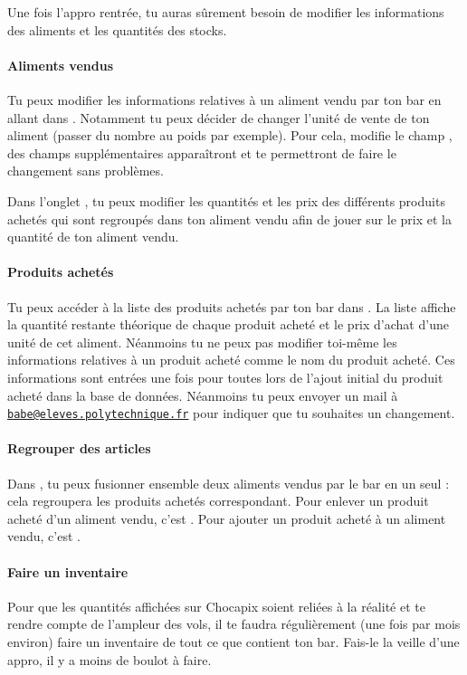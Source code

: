 \documentclass[12pt,french]{article}
\begin{document}
Une fois l'appro rentrée, tu auras sûrement besoin de modifier les informations des aliments et les quantités des stocks.

\paragraph{Aliments vendus} Tu peux modifier les informations relatives à un aliment vendu par ton bar en allant dans . Notamment tu peux décider de changer l'unité de vente de ton aliment (passer du nombre au poids par exemple). Pour cela, modifie le champ , des champs supplémentaires apparaîtront et te permettront de faire le changement sans problèmes.

Dans l'onglet , tu peux modifier les quantités et les prix des différents produits achetés qui sont regroupés dans ton aliment vendu afin de jouer sur le prix et la quantité de ton aliment vendu.

\paragraph{Produits achetés} Tu peux accéder à la liste des produits achetés par ton bar dans . La liste affiche la quantité restante théorique de chaque produit acheté et le prix d'achat d'une unité de cet aliment. Néanmoins tu ne peux pas modifier toi-même les informations relatives à un produit acheté comme le nom du produit acheté. Ces informations sont entrées une fois pour toutes lors de l'ajout initial du produit acheté dans la base de données. Néanmoins tu peux envoyer un mail à \href{mailto:babe@eleves.polytechnique.fr}{\texttt{babe@eleves.polytechnique.fr}} pour indiquer que tu souhaites un changement.

\paragraph{Regrouper des articles} Dans , tu peux fusionner ensemble deux aliments vendus par le bar en un seul : cela regroupera les produits achetés correspondant. Pour enlever un produit acheté d'un aliment vendu, c'est . Pour ajouter un produit acheté à un aliment vendu, c'est .

\paragraph{Faire un inventaire} Pour que les quantités affichées sur Chocapix soient reliées à la réalité et te rendre compte de l'ampleur des vols, il te faudra régulièrement (une fois par mois environ) faire un inventaire de tout ce que contient ton bar. Fais-le la veille d'une appro, il y a moins de boulot à faire.
\end{document}
